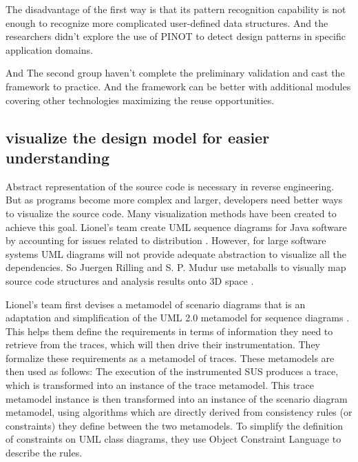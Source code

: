 \documentclass[acmsmall]{acmart}
\begin{document}
The disadvantage of the first way is that its pattern recognition capability is not enough to recognize more complicated user-defined data structures. And the researchers didn’t explore the use of PINOT to detect design patterns in specific application domains.

And The second group haven’t complete the preliminary validation and cast the framework to practice. And the framework can be better with additional modules covering other technologies maximizing the reuse opportunities.


\subsection{visualize the design model for easier understanding}


Abstract representation of the source code is necessary in reverse engineering. But as programs become more complex and larger, developers need better ways to visualize the source code. Many visualization methods have been created to achieve this goal. Lionel's team create UML sequence diagrams for Java software by accounting for issues related to distribution \cite{2006Toward}. However, for large software systems UML diagrams will not provide adequate abstraction to visualize all the dependencies. So Juergen Rilling and S. P. Mudur use metaballs to visually map source code structures and analysis results onto 3D space \cite{2002On}.

Lionel's team first devises a metamodel of scenario diagrams that is an adaptation and simplification of the UML 2.0 metamodel for sequence diagrams . This helps them define the requirements in terms of information they need to retrieve from the traces, which will then drive their instrumentation. They formalize these requirements as a metamodel of traces. These metamodels are then used as follows: The execution of the instrumented SUS produces a trace, which is transformed into an instance of the trace metamodel. This trace metamodel instance is then transformed into an instance of the scenario diagram metamodel, using algorithms which are directly derived from consistency rules (or constraints) they define between the two metamodels. To simplify the definition of constraints on UML class diagrams, they use Object Constraint Language to describe the rules.
\end{document}
